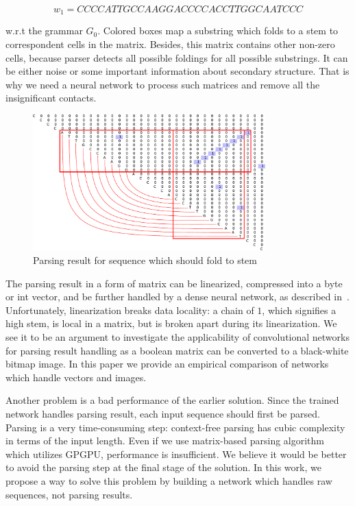 \documentclass[runningheads]{llncs}
\begin{document}
\[
w_1 = CCCCATTGCCAAGGACCCCACCTTGGCAATCCC
\]

w.r.t the grammar $G_0$.
Colored boxes map a substring which folds to a stem to correspondent cells in the matrix. Besides, this matrix contains other non-zero cells, because parser detects all possible foldings for all possible substrings. It can be either noise or some important information about secondary structure. That is why we need a neural network to process such matrices and remove all the insignificant contacts.

\begin{figure}[h]
\begin{center}
\centering
\includegraphics[width=0.8\textwidth]{figures/4.pdf}
\caption{Parsing result for sequence which should fold to
stem}
\label{fig:example}
\end{center}
\end{figure}

The parsing result in a form of matrix can be linearized, compressed into a byte or int vector, and be further handled by a dense neural network, as described in~\cite{grigorevcomposition}.
Unfortunately, linearization breaks data locality: a chain of $1$, which signifies a high stem, is local in a matrix, but is broken apart during its linearization.
We see it to be an argument to investigate the applicability of convolutional networks for parsing result handling as a boolean matrix can be converted to a black-white bitmap image.
In this paper we provide an empirical comparison of networks which handle vectors and images.

Another problem is a bad performance of the earlier solution.
Since the trained network handles parsing result, each input sequence should first be parsed.
Parsing is a very time-consuming step: context-free parsing has cubic complexity in terms of the input length.
Even if we use matrix-based parsing algorithm~\cite{Azimov:2018:CPQ:3210259.3210264} which utilizes GPGPU, performance is insufficient.
We believe it would be better to avoid the parsing step at the final stage of the solution.
In this work, we propose a way to solve this problem by building a network which handles raw sequences, not parsing results.
\end{document}
